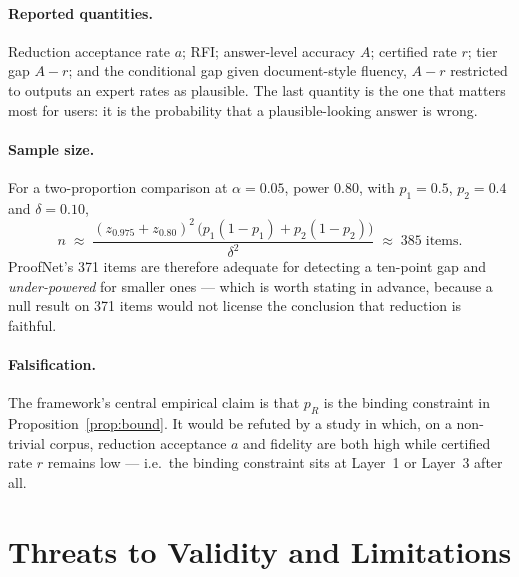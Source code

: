 \documentclass[11pt,a4paper]{article}
\theoremstyle{plain}
\theoremstyle{remark}
\begin{document}
\paragraph{Reported quantities.}  Reduction acceptance rate $a$; RFI;
answer-level accuracy $A$; certified rate $r$; tier gap $A-r$; and the
conditional gap given document-style fluency, $A-r$ restricted to outputs an
expert rates as plausible.  The last quantity is the one that matters most for
users: it is the probability that a plausible-looking answer is wrong.

\paragraph{Sample size.}  For a two-proportion comparison at $\alpha=0.05$,
power $0.80$, with $p_1=0.5$, $p_2=0.4$ and $\delta=0.10$,
\[
  n \;\approx\; \frac{(z_{0.975}+z_{0.80})^{2}\,\bigl(p_1(1-p_1)+p_2(1-p_2)\bigr)}{\delta^{2}}
  \;\approx\; 385 \;\text{items}.
\]
ProofNet's 371 items are therefore adequate for detecting a ten-point gap and
\emph{under-powered} for smaller ones --- which is worth stating in advance,
because a null result on 371 items would not license the conclusion that
reduction is faithful.

\paragraph{Falsification.}  The framework's central empirical claim is that
$p_R$ is the binding constraint in Proposition~\ref{prop:bound}.  It would be
refuted by a study in which, on a non-trivial corpus, reduction acceptance $a$
and fidelity are both high while certified rate $r$ remains low --- i.e.\ the
binding constraint sits at Layer~1 or Layer~3 after all.

\section{Threats to Validity and Limitations}
\label{sec:limits}
\end{document}

